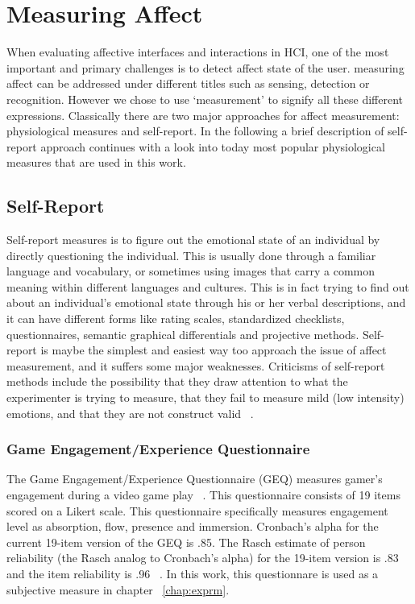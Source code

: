 \section{Measuring Affect}
When evaluating affective interfaces and interactions in HCI, one of the most important and primary challenges is to detect affect state of the user. measuring affect can be addressed under different titles such as sensing, detection or recognition. However we chose to use `measurement' to signify all these different expressions. Classically there are two major approaches for affect measurement: physiological measures and self-report. In the following a brief description of self-report approach continues with a look into today most popular physiological measures that are used in this work.

\subsection{Self-Report}
Self-report measures is to figure out the emotional state of an individual by directly questioning the individual. This is usually done through a familiar language and vocabulary, or sometimes using images that carry a common meaning within different languages and cultures. This is in fact trying to find out about an individual's emotional state through his or her verbal descriptions, and it can have different forms like rating scales, standardized checklists, questionnaires, semantic graphical differentials and projective methods. Self-report is maybe the simplest and easiest way too approach the issue of affect measurement, and it suffers some major weaknesses. Criticisms of self-report methods include the possibility that they draw attention to what the experimenter is trying to measure, that they fail to measure mild (low intensity) emotions, and that they are not construct valid ~\cite{isen2007some}.

\subsubsection{Game Engagement/Experience Questionnaire}
The Game Engagement/Experience Questionnaire (GEQ) measures gamer's engagement during a video game play ~\cite{brockmyer2009development}. This questionnaire consists of 19 items scored on a Likert scale. This questionnaire specifically measures engagement level as absorption, flow, presence and immersion. Cronbach’s alpha for the current 19-item version of the GEQ is .85. The Rasch estimate of person reliability (the Rasch analog to Cronbach’s alpha) for the 19-item version is .83 and the item reliability is .96 ~\cite{brockmyer2009development}. In this work, this questionnare is used as a subjective measure in chapter ~\ref{chap:exprm}.

